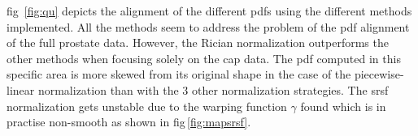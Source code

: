 \Acl{fig}~\ref{fig:qu} depicts the alignment of the different \acp{pdf} using the different methods implemented. 
All the methods seem to address the problem of the \ac{pdf} alignment of the full prostate data.
However, the Rician normalization outperforms the other methods when focusing solely on the \ac{cap} data.
The \ac{pdf} computed in this specific area is more skewed from its original shape in the case of the piecewise-linear normalization than with the 3 other normalization strategies.
The \ac{srsf} normalization gets unstable due to the warping function $\gamma$ found which is in practise non-smooth as shown in \acs{fig}\,\ref{fig:mapsrsf}.

\begin{landscape}

\begin{figure}
  \hspace*{\fill}
  \hfill
  \hspace*{\fill}
  \\
  \hspace*{\fill}
  \hfill

\end{figure}
\end{landscape}
